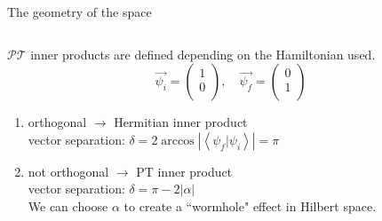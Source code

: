 \documentclass[10pt]{beamer}
\begin{document}
\begin{frame}{The geometry of the space}
\begin{columns}
    \hspace{1.5em}
    \begin{column}{\textwidth}
    $\mathcal{PT}$ inner products are defined depending on the Hamiltonian used.\\
    \pause
    \vspace{0.5cm}
    \begin{equation*}
        \vec{\psi_i} = \begin{pmatrix}
                1 \\
                0 \\                
        \end{pmatrix}, \quad
        \vec{\psi_f} = \begin{pmatrix}
                0 \\
                1 \\                
        \end{pmatrix}
        \end{equation*}
    \begin{enumerate}
        \item orthogonal $\to$ \textcolor{myNewColorA}{Hermitian} inner product\\
        \pause
        vector separation: $\delta = 2 \arccos{|\left< \psi_{f}| \psi_{i}\right>|} = \pi$\\
        \pause 
        \item not orthogonal $\to$ \textcolor{myNewColorC}{PT}  inner  product\\
        \pause
        vector separation: $\delta = \pi - 2|\alpha|$\\
        \pause 
        \vspace{0.5cm}
        We can choose $\alpha$ to create a ``wormhole" effect in Hilbert space.
        \end{enumerate}
    \end{column}
\end{columns}
\end{frame}

\end{document}
